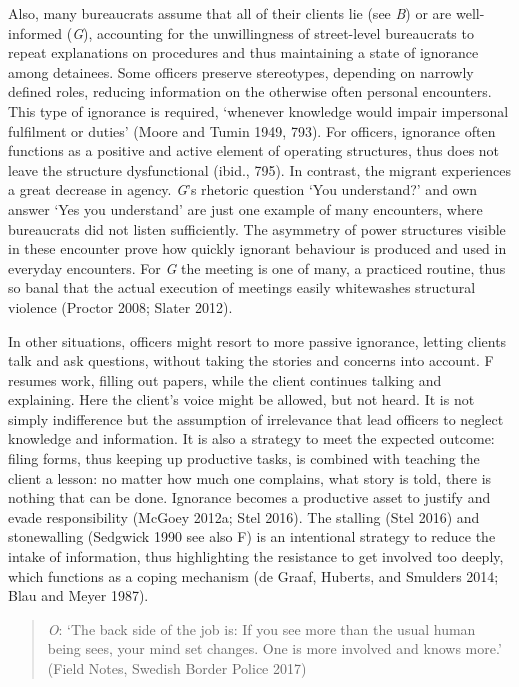 \par
Also, many bureaucrats assume that all of their clients lie (see \emph{B}) or are well-informed (\emph{G}), accounting for the unwillingness of street-level bureaucrats to repeat explanations on procedures and thus maintaining a state of ignorance among detainees. Some officers preserve stereotypes, depending on narrowly defined roles, reducing information on the otherwise often personal encounters. This type of ignorance is required, ‘whenever knowledge would impair impersonal fulfilment or duties’ (Moore and Tumin 1949, 793). For officers, ignorance often functions as a positive and active element of operating structures, thus does not leave the structure dysfunctional (ibid., 795). In contrast, the migrant experiences a great decrease in agency. \emph{G}’s rhetoric question ‘You understand?’ and own answer ‘Yes you understand’ are just one example of many encounters, where bureaucrats did not listen sufficiently. The asymmetry of power structures visible in these encounter prove how quickly ignorant behaviour is produced and used in everyday encounters. For \emph{G} the meeting is one of many, a practiced routine, thus so banal that the actual execution of meetings easily whitewashes structural violence (Proctor 2008; Slater 2012).
\par
In other situations, officers might resort to more passive ignorance, letting clients talk and ask questions, without taking the stories and concerns into account. F resumes work, filling out papers, while the client continues talking and explaining. Here the client’s voice might be allowed, but not heard. It is not simply indifference but the assumption of irrelevance that lead officers to neglect knowledge and information. It is also a strategy to meet the expected outcome: filing forms, thus keeping up productive tasks, is combined with teaching the client a lesson: no matter how much one complains, what story is told, there is nothing that can be done. Ignorance becomes a productive asset to justify and evade responsibility (McGoey 2012a; Stel 2016). The stalling (Stel 2016) and stonewalling (Sedgwick 1990 see also F) is an intentional strategy to reduce the intake of information, thus highlighting the resistance to get involved too deeply, which functions as a coping mechanism (de Graaf, Huberts, and Smulders 2014; Blau and Meyer 1987). 
    \blockquote{\emph{O}: ‘The back side of the job is: If you see more than the usual human being sees, your mind set changes. One is more involved and knows more.’ (Field Notes, Swedish Border Police 2017)}
